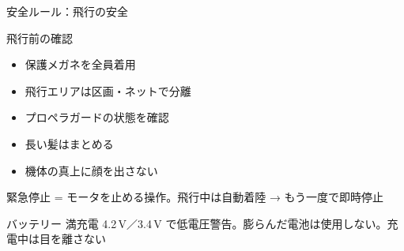 \begin{frame}{安全ルール：飛行の安全}
  \begin{block}{飛行前の確認}
    \begin{itemize}\small\setlength{\itemsep}{0pt}
      \item 保護メガネを全員着用
      \item 飛行エリアは区画・ネットで分離
      \item プロペラガードの状態を確認
      \item 長い髪はまとめる
      \item 機体の真上に顔を出さない
    \end{itemize}
  \end{block}

  \vspace{0.15em}

  \begin{alertblock}{緊急停止}
    \footnotesize {} = モータを止める操作。飛行中は自動着陸 → もう一度で即時停止
  \end{alertblock}

  \vspace{0.1em}

  \begin{exampleblock}{バッテリー}
    \footnotesize 満充電 4.2\,V／3.4\,V で低電圧警告。膨らんだ電池は使用しない。充電中は目を離さない
  \end{exampleblock}
\end{frame}


